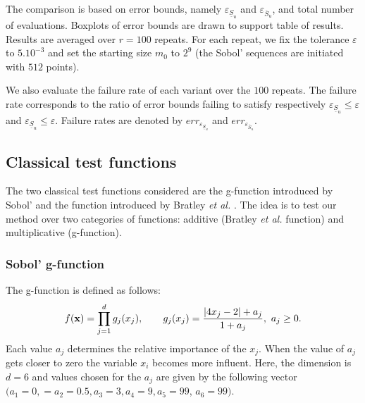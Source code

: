 The comparison is based on error bounds, namely $\varepsilon_{\underline{S}_u}$ and $\varepsilon_{\overline{S}_u}$, and total number of evaluations. Boxplots of error bounds are drawn to support table of results. Results are averaged over $r=100$ repeats. For each repeat, we fix the tolerance $\varepsilon$ to $5.10^{-3}$ and set the starting size $m_0$ to $2^9$ (the Sobol' sequences are initiated with $512$ points).

We also evaluate the failure rate of each variant over the $100$ repeats. The failure rate corresponds to the ratio of error bounds failing to satisfy respectively $\varepsilon_{\underline{S}_u} \leq \varepsilon$ and $\varepsilon_{\underline{S}_u} \leq \varepsilon$. Failure rates are denoted by ${err}_{\varepsilon_{\underline{S}_u}}$ and  ${err}_{\varepsilon_{\overline{S}_u}}$.

%

\subsection{Classical test functions}
\label{sec:5.1}

The two classical test functions considered are the g-function introduced by Sobol' \cite{Sobol'} and the function introduced by Bratley \textit{et al.} \cite{Bratley}. The idea is to test our method over two categories of functions: additive (Bratley \textit{et al.} function) and multiplicative (g-function).

\subsubsection{Sobol' g-function}

The g-function is defined as follows:
\begin{equation*}
f(\boldsymbol{\mathbf{x}})= \prod \limits_{j=1}^{d}g_j(x_j), \qquad g_j(x_j)=\frac{\left |4x_j-2 \right | + a_j}{1 + a_j}, \ a_j \geq 0.
\end{equation*}
Each value $a_j$ determines the relative importance of the $x_j$. When the value of $a_j$ gets closer to zero the variable $x_i$ becomes more influent. Here, the dimension is $d=6$ and values chosen for the $a_j$ are given by the following vector $(a_1=0,=a_2=0.5, a_3=3, a_4=9, a_5=99$, $a_6=99)$.


